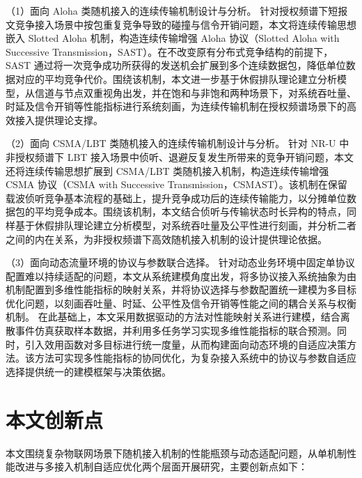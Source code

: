 （1）面向 Aloha 类随机接入的连续传输机制设计与分析。
针对授权频谱下短报文竞争接入场景中按包重复竞争导致的碰撞与信令开销问题，本文将连续传输思想嵌入 Slotted Aloha 机制，构造连续传输增强 Aloha 协议（Slotted Aloha with Successive Transmission，SAST）。在不改变原有分布式竞争结构的前提下，SAST 通过将一次竞争成功所获得的发送机会扩展到多个连续数据包，降低单位数据对应的平均竞争代价。围绕该机制，本文进一步基于休假排队理论建立分析模型，从信道与节点双重视角出发，并在饱和与非饱和两种场景下，对系统吞吐量、时延及信令开销等性能指标进行系统刻画，为连续传输机制在授权频谱场景下的高效接入提供理论支撑。

（2）面向 CSMA/LBT 类随机接入的连续传输机制设计与分析。
针对 NR-U 中非授权频谱下 LBT 接入场景中侦听、退避反复发生所带来的竞争开销问题，本文还将连续传输思想扩展到 CSMA/LBT 类随机接入机制，构造连续传输增强 CSMA 协议（CSMA with Successive Transmission，CSMAST）。该机制在保留载波侦听竞争基本流程的基础上，提升竞争成功后的连续传输能力，以分摊单位数据包的平均竞争成本。围绕该机制，本文结合侦听与传输状态时长异构的特点，同样基于休假排队理论建立分析模型，对系统吞吐量及公平性进行刻画，并分析二者之间的内在关系，为非授权频谱下高效随机接入机制的设计提供理论依据。

（3）面向动态流量环境的协议与参数联合选择。
针对动态业务环境中固定单协议配置难以持续适配的问题，本文从系统建模角度出发，将多协议接入系统抽象为由机制配置到多维性能指标的映射关系，并将协议选择与参数配置统一建模为多目标优化问题，以刻画吞吐量、时延、公平性及信令开销等性能之间的耦合关系与权衡机制。
在此基础上，本文采用数据驱动的方法对性能映射关系进行建模，结合离散事件仿真获取样本数据，并利用多任务学习实现多维性能指标的联合预测。同时，引入效用函数对多目标进行统一度量，从而构建面向动态环境的自适应决策方法。该方法可实现多性能指标的协同优化，为复杂接入系统中的协议与参数自适应选择提供统一的建模框架与决策依据。


\section{本文创新点}
\label{sec:contributions}

本文围绕复杂物联网场景下随机接入机制的性能瓶颈与动态适配问题，从单机制性能改进与多接入机制自适应优化两个层面开展研究，主要创新点如下：

